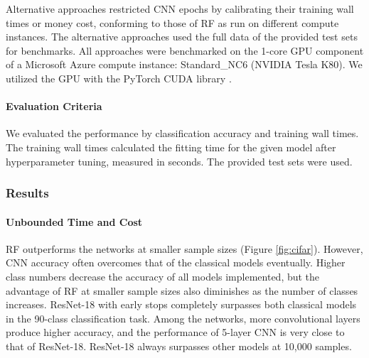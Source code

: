 Alternative approaches restricted CNN epochs by calibrating their training wall times or money cost, conforming to those of RF as run on different compute instances. The alternative approaches used the full data of the provided test sets for benchmarks. All approaches were benchmarked on the 1-core GPU component of a Microsoft Azure compute instance: Standard\_NC6 (NVIDIA Tesla K80).
We utilized the GPU with the PyTorch CUDA library \citep{pytorch}.

\paragraph{Evaluation Criteria}
We evaluated the performance by classification accuracy and training wall times. The training wall times calculated the fitting time for the given model after hyperparameter tuning, measured in seconds. The provided test sets were used.

\subsubsection{Results}
\paragraph{Unbounded Time and Cost}
RF outperforms the networks at smaller sample sizes (Figure \ref{fig:cifar}). However, CNN accuracy often overcomes that of the classical models eventually. Higher class numbers decrease the accuracy of all models implemented, but the advantage of RF at smaller sample sizes also diminishes as the number of classes increases. ResNet-18 with early stops completely surpasses both classical models in the 90-class classification task. Among the networks, more convolutional layers produce higher accuracy, and the performance of 5-layer CNN is very close to that of ResNet-18. ResNet-18 always surpasses other models at 10,000 samples.

